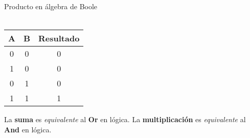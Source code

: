 \documentclass{article}
\begin{document}
\begin{center}
    Producto en álgebra de Boole\\
    \hfill \\
    \begin{tabular}{ c c c }
        A & B & Resultado \\
        \hline
        0 & 0 & 0         \\
        1 & 0 & 0         \\
        0 & 1 & 0         \\
        1 & 1 & 1         \\
        \hline
    \end{tabular}
\end{center}

La \textbf{suma} es \textit{equivalente} al \textbf{Or} en lógica.
La \textbf{multiplicación} es \textit{equivalente} al \textbf{And} en lógica.
\end{document}
